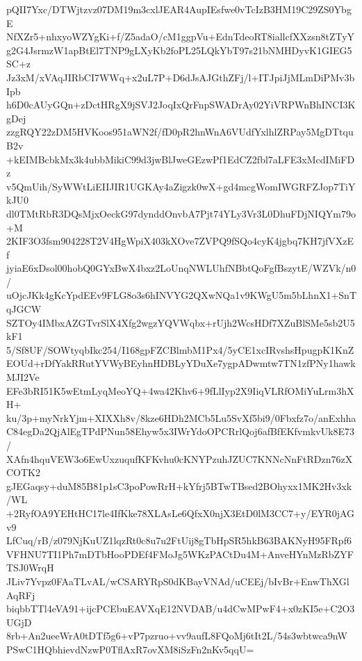 pQII7Yxc/DTWjtzvz07DM19m3cxlJEAR4AupIEsfwe0vTcIzB3HM19C29ZS0YbgE
NfXZr5+nhxyoWZYgKi+f/Z5adaO/cM1ggpVu+EdnTdeoRT8iallcfXXzsn8tZTyY
g2G4JsrmzW1apBtEl7TNP9gLXyKb2foPL25LQkYbT97s21bNMHDyvK1GIEG5SC+z
Jz3xM/xVAqJIRbCI7WWq+x2uL7P+D6dJsAJGthZFj/l+ITJpiJjMLmDiPMv3bIpb
h6D0cAUyGQn+zDctHRgX9jSVJ2JoqIxQrFnpSWADrAy02YiVRPWnBhINCI3KgDej
zzgRQY22zDM5HVKoos951aWN2f/fD0pR2hnWnA6VUdfYxlhlZRPay5MgDTtquB2v
+kEIMBcbkMx3k4ubbMikiC99d3jwBlJweGEzwPf1EdCZ2fbl7aLFE3xMcdIMiFDz
v5QmUih/SyWWtLiEIIJIR1UGKAy4aZigzk0wX+gd4mcgWomIWGRFZJop7TiYkJU0
dl0TMtRbR3DQsMjxOeckG97dynddOnvbA7Pjt74YLy3Vr3L0DhuFDjNIQYm79o+M
2KIF3O3fsm904228T2V4HgWpiX403kXOve7ZVPQ9fSQo4cyK4jgbq7KH7jfVXzEf
jyiaE6xDsol00hobQ0GYxBwX4bxz2LoUnqNWLUhfNBbtQoFgfBszytE/WZVk/n0/
uOjcJKk4gKcYpdEEv9FLG8o3s6hINVYG2QXwNQa1v9KWgU5m5bLhnX1+SnTqJGCW
SZTOy4IMbxAZGTvrSlX4Xfg2wgzYQVWqbx+rUjh2WcsHDf7XZuBlSMe5sb2U5kF1
5/Sf8UF/SOWtyqbIkc254/I168gpFZCBlmbM1Px4/5yCE1xcIRvshsHpugpK1KnZ
EOUd+rDfYakRRutYVWyBEyhnHDBLyYDuXe7ygpADwmtw7TN1zfPNy1hawkMJI2Ve
EFe3bRI51K5wEtmLyqMeoYQ+4wa42Khv6+9fLlIyp2X9IiqVLRfOMiYuLrm3hXH+
ku/3p+myNrkYjm+XIXXh8v/8kze6HDh2MCb5Lu5SvXf5bi9/0Fbxfz7o/anExhha
C84egDa2QjAlEgTPdPNun58Ehyw5x3IWrYdoOPCRrlQoj6afBfEKfvmkvUk8E73/
XAfn4hquVEW3o6EwUxzuqufKFKvhu0cKNYPzuhJZUC7KNNcNnFtRDzn76zXCOTK2
gJEGaqsy+duM85B81p1sC3poPowRrH+kYfrj5BTwTBsed2BOhyxx1MK2Hv3xk/WL
+2RyfOA9YEHtHC17le4IfKke78XLAsLe6QfxX0njX3EtD0lM3CC7+y/EYR0jAGv9
LfCuq/rB/z079NjKuUZ1lqzRt0c8u7u2FtUij8gTbHpSR5hkB63BAKNyH95FRpf6
VFHNU7TI1Ph7mDTbHooPDEf4FMoJg5WKzPACtDu4M+AnveHYnMzRbZYFTSJ0WrqH
JLiv7Yvpz0FAaTLvAL/wCSARYRpS0dKBayVNAd/uCEEj/bIvBr+EnwThXGlAqRFj
biqbbTTl4eVA91+ijcPCEbuEAVXqE12NVDAB/u4dCwMPwF4+x0zKI5e+C2O3UGjD
8rb+An2ueeWrA0tDTf5g6+vP7pzruo+vv9aufL8FQoMj6tIt2L/54s3wbtwca9nW
PSwC1HQbhievdNzwP0TflAxR7ovXM8iSzFn2nKv5qqU=

